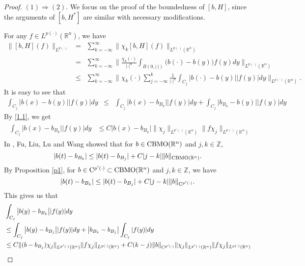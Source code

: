 \documentclass{amse-new}
\numberwithin{equation}{section} %
\begin{document}
\begin{proof}
$(1)\Rightarrow (2)$. We focus on the proof of the boundedness of $[b,H]$, since the arguments of $[b,H^{*}]$ are similar with necessary modifications.

For any $f\in L^{p(\cdot)}(\mathbb{R}^n)$, we have
\begin{eqnarray*}
\|[b,H](f)\|_{L^{p(\cdot)}}&=&\sum_{k=-\infty}^{\infty}\|\chi_{k}[b,H](f)\|_{L^{p(\cdot)}(\mathbb{R}^n)}\\
&=&\sum_{k=-\infty}^{\infty}\Big\|\frac{\chi_{k}(\cdot)}{|\cdot|^{n}}\int_{B(0,|\cdot|)}\big(b(\cdot)-b(y)\big)f(y)dy\Big\|_{L^{p(\cdot)}(\mathbb{R}^n)}\\
&\leq&\sum_{k=-\infty}^{\infty}\Big\|\chi_{k}(\cdot)
\sum_{j=-\infty}^{k}\frac{1}{|\cdot|^{n}}\int_{C_{j}}\big|b(\cdot)-b(y)\big||f(y)|dy\Big\|_{L^{p(\cdot)}(\mathbb{R}^n)}.
\end{eqnarray*}
It is easy to see that
\begin{eqnarray*}
\int_{C_{j}}\big|b(x)-b(y)\big||f(y)|dy&\leq&\int_{C_{j}}\big|b(x)-b_{B_{k}}\big||f(y)|dy+\int_{C_{j}}\big|b_{B_{k}}-b(y)\big||f(y)|dy
\end{eqnarray*}
By \eqref{1.1}, we get
\begin{eqnarray}\label{4.1}
\begin{split}
\int_{C_{j}}\big|b(x)-b_{B_{k}}\big||f(y)|dy
&\leq C\big|b(x)-b_{B_{k}}\big|\|\chi_{j}\|_{L^{p'(\cdot)}(\mathbb{R}^n)}\|f\chi_{j}\|_{L^{p(\cdot)}(\mathbb{R}^n)}
\end{split}
\end{eqnarray}
In \cite{FLLW}, Fu, Liu, Lu and Wang showed that for $b\in {\rm CBMO}(\mathbb{R}^n)$ and $j,k\in \mathbb{Z}$,
$$|b(t)-b_{B_{k}}|\leq |b(t)-b_{B_{j}}|+C|j-k|\|b\|_{{\rm CBMO}(\mathbb{R}^n)}.$$
By Proposition \ref{p1}, for $b\in {\rm C}^{p'(\cdot)}\subset {\rm CBMO}(\mathbb{R}^n)$ and $j,k\in \mathbb{Z}$, we have
$$|b(t)-b_{B_{k}}|\leq |b(t)-b_{B_{j}}|+C|j-k|\|b\|_{{\rm C}^{p'(\cdot)}}.$$
This gives us that
\begin{eqnarray}\label{4.2}
\begin{split}
&\int_{C_{j}}\big|b(y)-b_{B_{k}}\big||f(y)|dy\\
&\leq \int_{C_{j}}\big|b(y)-b_{B_{j}}\big||f(y)|dy+\big|b_{B_{k}}-b_{B_{j}}\big|\int_{C_{j}}|f(y)|dy\\
&\leq C\|(b-b_{B_{j}})\chi_{j}\|_{L^{p'(\cdot)}(\mathbb{R}^n)}\|f\chi_{j}\|_{L^{p(\cdot)}(\mathbb{R}^n)}
+C(k-j)\|b\|_{{\rm C}^{p'(\cdot)}}\|\chi_{j}\|_{L^{p'(\cdot)}(\mathbb{R}^n)}\|f\chi_{j}\|_{L^{p(\cdot)}(\mathbb{R}^n)}\\

\end{split}
\end{eqnarray}
\end{proof}
\end{document}
